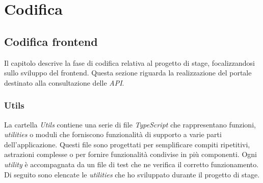 \chapter{Codifica}\label{cap:codifica}


\section{Codifica frontend}\label{sec:codifica-front-end}
Il capitolo descrive la fase di codifica relativa al progetto di stage, focalizzandosi sullo sviluppo del frontend. Questa sezione riguarda la realizzazione 
del portale destinato alla consultazione delle \textit{API}.
\subsection{Utils}\label{subsec:utils}
La cartella \textit{Utils} contiene una serie di file \textit{TypeScript} che rappresentano funzioni, \textit{utilities} o moduli che forniscono funzionalità di supporto a varie parti dell'applicazione.
Questi file sono progettati per semplificare compiti ripetitivi, astrazioni complesse o per fornire funzionalità condivise in più componenti. Ogni \textit{utility} è accompagnata 
da un file di test che ne verifica il corretto funzionamento.\\
Di seguito sono elencate le \textit{utilities} che ho sviluppato durante il progetto di stage.


